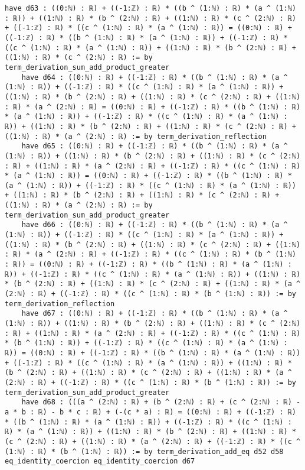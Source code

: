 \documentclass{article}
\begin{document}
\begin{tcolorbox}[colback=white!10, width=\linewidth]
\begin{lstlisting}[language=Lean4]
    have d63 : ((0:ℕ) : ℝ) + ((-1:ℤ) : ℝ) * ((b ^ (1:ℕ) : ℝ) * (a ^ (1:ℕ) : ℝ)) + ((1:ℕ) : ℝ) * (b ^ (2:ℕ) : ℝ) + ((1:ℕ) : ℝ) * (c ^ (2:ℕ) : ℝ) + ((-1:ℤ) : ℝ) * ((c ^ (1:ℕ) : ℝ) * (a ^ (1:ℕ) : ℝ)) = ((0:ℕ) : ℝ) + ((-1:ℤ) : ℝ) * ((b ^ (1:ℕ) : ℝ) * (a ^ (1:ℕ) : ℝ)) + ((-1:ℤ) : ℝ) * ((c ^ (1:ℕ) : ℝ) * (a ^ (1:ℕ) : ℝ)) + ((1:ℕ) : ℝ) * (b ^ (2:ℕ) : ℝ) + ((1:ℕ) : ℝ) * (c ^ (2:ℕ) : ℝ) := by term_derivation_sum_add_product_greater
    have d64 : ((0:ℕ) : ℝ) + ((-1:ℤ) : ℝ) * ((b ^ (1:ℕ) : ℝ) * (a ^ (1:ℕ) : ℝ)) + ((-1:ℤ) : ℝ) * ((c ^ (1:ℕ) : ℝ) * (a ^ (1:ℕ) : ℝ)) + ((1:ℕ) : ℝ) * (b ^ (2:ℕ) : ℝ) + ((1:ℕ) : ℝ) * (c ^ (2:ℕ) : ℝ) + ((1:ℕ) : ℝ) * (a ^ (2:ℕ) : ℝ) = ((0:ℕ) : ℝ) + ((-1:ℤ) : ℝ) * ((b ^ (1:ℕ) : ℝ) * (a ^ (1:ℕ) : ℝ)) + ((-1:ℤ) : ℝ) * ((c ^ (1:ℕ) : ℝ) * (a ^ (1:ℕ) : ℝ)) + ((1:ℕ) : ℝ) * (b ^ (2:ℕ) : ℝ) + ((1:ℕ) : ℝ) * (c ^ (2:ℕ) : ℝ) + ((1:ℕ) : ℝ) * (a ^ (2:ℕ) : ℝ) := by term_derivation_reflection
    have d65 : ((0:ℕ) : ℝ) + ((-1:ℤ) : ℝ) * ((b ^ (1:ℕ) : ℝ) * (a ^ (1:ℕ) : ℝ)) + ((1:ℕ) : ℝ) * (b ^ (2:ℕ) : ℝ) + ((1:ℕ) : ℝ) * (c ^ (2:ℕ) : ℝ) + ((1:ℕ) : ℝ) * (a ^ (2:ℕ) : ℝ) + ((-1:ℤ) : ℝ) * ((c ^ (1:ℕ) : ℝ) * (a ^ (1:ℕ) : ℝ)) = ((0:ℕ) : ℝ) + ((-1:ℤ) : ℝ) * ((b ^ (1:ℕ) : ℝ) * (a ^ (1:ℕ) : ℝ)) + ((-1:ℤ) : ℝ) * ((c ^ (1:ℕ) : ℝ) * (a ^ (1:ℕ) : ℝ)) + ((1:ℕ) : ℝ) * (b ^ (2:ℕ) : ℝ) + ((1:ℕ) : ℝ) * (c ^ (2:ℕ) : ℝ) + ((1:ℕ) : ℝ) * (a ^ (2:ℕ) : ℝ) := by term_derivation_sum_add_product_greater
    have d66 : ((0:ℕ) : ℝ) + ((-1:ℤ) : ℝ) * ((b ^ (1:ℕ) : ℝ) * (a ^ (1:ℕ) : ℝ)) + ((-1:ℤ) : ℝ) * ((c ^ (1:ℕ) : ℝ) * (a ^ (1:ℕ) : ℝ)) + ((1:ℕ) : ℝ) * (b ^ (2:ℕ) : ℝ) + ((1:ℕ) : ℝ) * (c ^ (2:ℕ) : ℝ) + ((1:ℕ) : ℝ) * (a ^ (2:ℕ) : ℝ) + ((-1:ℤ) : ℝ) * ((c ^ (1:ℕ) : ℝ) * (b ^ (1:ℕ) : ℝ)) = ((0:ℕ) : ℝ) + ((-1:ℤ) : ℝ) * ((b ^ (1:ℕ) : ℝ) * (a ^ (1:ℕ) : ℝ)) + ((-1:ℤ) : ℝ) * ((c ^ (1:ℕ) : ℝ) * (a ^ (1:ℕ) : ℝ)) + ((1:ℕ) : ℝ) * (b ^ (2:ℕ) : ℝ) + ((1:ℕ) : ℝ) * (c ^ (2:ℕ) : ℝ) + ((1:ℕ) : ℝ) * (a ^ (2:ℕ) : ℝ) + ((-1:ℤ) : ℝ) * ((c ^ (1:ℕ) : ℝ) * (b ^ (1:ℕ) : ℝ)) := by term_derivation_reflection
    have d67 : ((0:ℕ) : ℝ) + ((-1:ℤ) : ℝ) * ((b ^ (1:ℕ) : ℝ) * (a ^ (1:ℕ) : ℝ)) + ((1:ℕ) : ℝ) * (b ^ (2:ℕ) : ℝ) + ((1:ℕ) : ℝ) * (c ^ (2:ℕ) : ℝ) + ((1:ℕ) : ℝ) * (a ^ (2:ℕ) : ℝ) + ((-1:ℤ) : ℝ) * ((c ^ (1:ℕ) : ℝ) * (b ^ (1:ℕ) : ℝ)) + ((-1:ℤ) : ℝ) * ((c ^ (1:ℕ) : ℝ) * (a ^ (1:ℕ) : ℝ)) = ((0:ℕ) : ℝ) + ((-1:ℤ) : ℝ) * ((b ^ (1:ℕ) : ℝ) * (a ^ (1:ℕ) : ℝ)) + ((-1:ℤ) : ℝ) * ((c ^ (1:ℕ) : ℝ) * (a ^ (1:ℕ) : ℝ)) + ((1:ℕ) : ℝ) * (b ^ (2:ℕ) : ℝ) + ((1:ℕ) : ℝ) * (c ^ (2:ℕ) : ℝ) + ((1:ℕ) : ℝ) * (a ^ (2:ℕ) : ℝ) + ((-1:ℤ) : ℝ) * ((c ^ (1:ℕ) : ℝ) * (b ^ (1:ℕ) : ℝ)) := by term_derivation_sum_add_product_greater
    have d68 : (((a ^ (2:ℕ) : ℝ) + (b ^ (2:ℕ) : ℝ) + (c ^ (2:ℕ) : ℝ) - a * b : ℝ) - b * c : ℝ) + (-(c * a) : ℝ) = ((0:ℕ) : ℝ) + ((-1:ℤ) : ℝ) * ((b ^ (1:ℕ) : ℝ) * (a ^ (1:ℕ) : ℝ)) + ((-1:ℤ) : ℝ) * ((c ^ (1:ℕ) : ℝ) * (a ^ (1:ℕ) : ℝ)) + ((1:ℕ) : ℝ) * (b ^ (2:ℕ) : ℝ) + ((1:ℕ) : ℝ) * (c ^ (2:ℕ) : ℝ) + ((1:ℕ) : ℝ) * (a ^ (2:ℕ) : ℝ) + ((-1:ℤ) : ℝ) * ((c ^ (1:ℕ) : ℝ) * (b ^ (1:ℕ) : ℝ)) := by term_derivation_add_eq d52 d58 eq_identity_coercion eq_identity_coercion d67

\end{lstlisting}
\end{tcolorbox}
\end{document}
